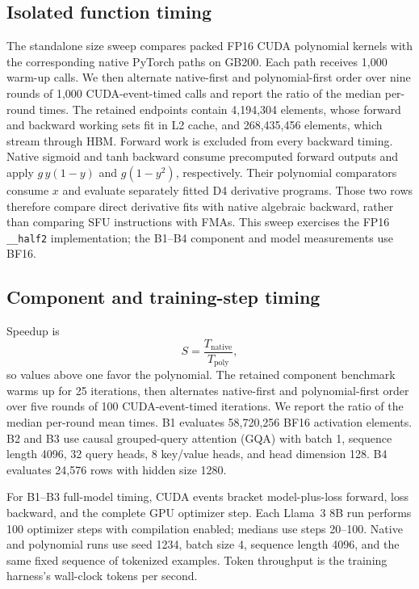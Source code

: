 \documentclass[11pt]{article}
\newcommand{\poly}{\mathrm{poly}}
\newcommand{\native}{\mathrm{native}}
\begin{document}
\subsection{Isolated function timing}

The standalone size sweep compares packed FP16 CUDA polynomial kernels with
the corresponding native PyTorch paths on GB200. Each path receives
1,000 warm-up calls. We then alternate native-first and polynomial-first order
over nine rounds of 1,000 CUDA-event-timed calls and report the ratio of the
median per-round times. The retained endpoints contain 4,194,304 elements,
whose forward and backward working sets fit in L2 cache, and 268,435,456
elements, which stream through HBM. Forward work is excluded from every
backward timing. Native sigmoid and tanh backward consume precomputed forward
outputs and apply $g\,y(1-y)$ and $g(1-y^2)$, respectively. Their polynomial
comparators consume $x$ and evaluate separately fitted D4 derivative programs.
Those two rows therefore compare direct derivative fits with native algebraic
backward, rather than comparing SFU instructions with FMAs. This sweep
exercises the FP16 \texttt{\_\_half2} implementation; the B1--B4 component and
model measurements use BF16.

\subsection{Component and training-step timing}

Speedup is
\begin{equation}
    S=\frac{T_{\native}}{T_{\poly}},
\end{equation}
so values above one favor the polynomial. The retained component benchmark
warms up for 25 iterations, then alternates native-first and polynomial-first
order over five rounds of 100 CUDA-event-timed iterations. We report the ratio
of the median per-round mean times. B1 evaluates 58,720,256 BF16 activation
elements. B2 and B3 use causal grouped-query attention (GQA) with batch 1,
sequence length 4096, 32 query heads, 8 key/value heads, and head dimension 128.
B4 evaluates 24,576 rows with hidden size 1280.

For B1--B3 full-model timing, CUDA events bracket model-plus-loss forward,
loss backward, and the complete GPU optimizer step. Each Llama~3 8B run
performs 100 optimizer steps with compilation enabled; medians use steps
20--100. Native and polynomial runs use seed 1234, batch size 4, sequence
length 4096, and the same fixed sequence of tokenized examples. Token
throughput is the training harness's wall-clock tokens per second.
\end{document}
